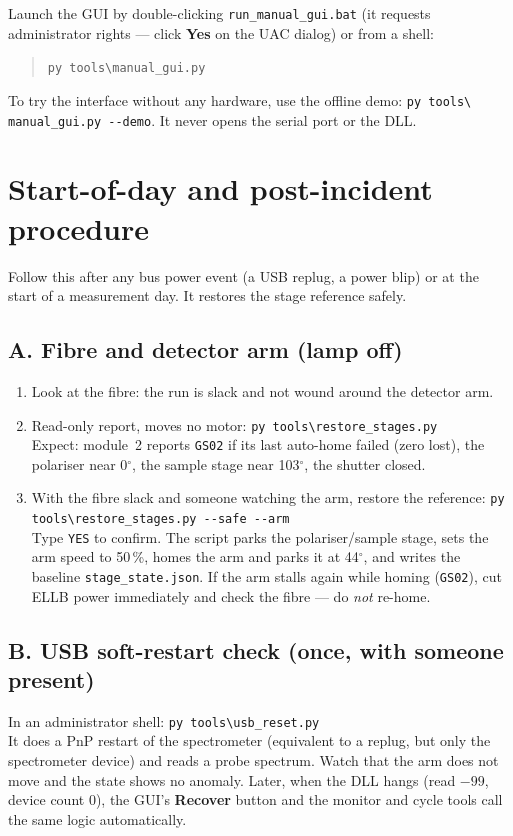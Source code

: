 \documentclass[11pt]{article}
\newcommand{\code}[1]{\texttt{\small #1}}
\begin{document}
\noindent Launch the GUI by double-clicking \code{run\_manual\_gui.bat} (it requests administrator
rights --- click \textbf{Yes} on the UAC dialog) or from a shell:
\begin{quote}\code{py tools\textbackslash manual\_gui.py}\end{quote}
To try the interface without any hardware, use the offline demo: \code{py tools\textbackslash
manual\_gui.py -{}-demo}. It never opens the serial port or the DLL.

\section{Start-of-day and post-incident procedure}

Follow this after any bus power event (a USB replug, a power blip) or at the start of a measurement
day. It restores the stage reference safely.

\subsection{A. Fibre and detector arm (lamp off)}
\begin{enumerate}
\item Look at the fibre: the run is slack and not wound around the detector arm.
\item Read-only report, moves no motor: \quad\code{py tools\textbackslash restore\_stages.py}\\
Expect: module~2 reports \code{GS02} if its last auto-home failed (zero lost), the polariser near
0$^\circ$, the sample stage near 103$^\circ$, the shutter closed.
\item With the fibre slack and someone watching the arm, restore the reference:
\quad\code{py tools\textbackslash restore\_stages.py -{}-safe -{}-arm}\\
Type \code{YES} to confirm. The script parks the polariser/sample stage, sets the arm speed to 50\,\%,
homes the arm and parks it at 44$^\circ$, and writes the baseline \code{stage\_state.json}. If the arm
stalls again while homing (\code{GS02}), cut ELLB power immediately and check the fibre --- do
\emph{not} re-home.
\end{enumerate}

\subsection{B. USB soft-restart check (once, with someone present)}
In an administrator shell: \quad\code{py tools\textbackslash usb\_reset.py}\\
It does a PnP restart of the spectrometer (equivalent to a replug, but only the spectrometer device)
and reads a probe spectrum. Watch that the arm does not move and the state shows no anomaly. Later,
when the DLL hangs (read $-99$, device count 0), the GUI's \textbf{Recover} button and the monitor and
cycle tools call the same logic automatically.
\end{document}
